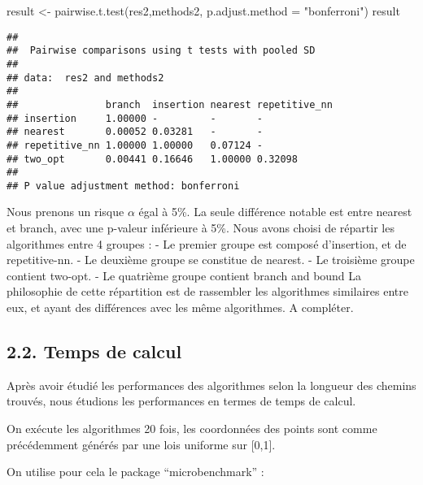 \documentclass[
]{article}
\newenvironment{Shaded}{\begin{snugshade}}{\end{snugshade}}
\newcommand{\AttributeTok}[1]{\textcolor[rgb]{0.77,0.63,0.00}{#1}}
\newcommand{\FunctionTok}[1]{\textcolor[rgb]{0.00,0.00,0.00}{#1}}
\newcommand{\NormalTok}[1]{#1}
\newcommand{\OtherTok}[1]{\textcolor[rgb]{0.56,0.35,0.01}{#1}}
\newcommand{\StringTok}[1]{\textcolor[rgb]{0.31,0.60,0.02}{#1}}
\begin{document}
\begin{Shaded}
\begin{Highlighting}[]
\NormalTok{result }\OtherTok{\textless{}{-}} \FunctionTok{pairwise.t.test}\NormalTok{(res2,methods2, }\AttributeTok{p.adjust.method =} \StringTok{"bonferroni"}\NormalTok{)}
\NormalTok{result}
\end{Highlighting}
\end{Shaded}

\begin{verbatim}
## 
##  Pairwise comparisons using t tests with pooled SD 
## 
## data:  res2 and methods2 
## 
##               branch  insertion nearest repetitive_nn
## insertion     1.00000 -         -       -            
## nearest       0.00052 0.03281   -       -            
## repetitive_nn 1.00000 1.00000   0.07124 -            
## two_opt       0.00441 0.16646   1.00000 0.32098      
## 
## P value adjustment method: bonferroni
\end{verbatim}

Nous prenons un risque \(\alpha\) égal à 5\%. La seule différence
notable est entre nearest et branch, avec une p-valeur inférieure à 5\%.
Nous avons choisi de répartir les algorithmes entre 4 groupes : - Le
premier groupe est composé d'insertion, et de repetitive-nn. - Le
deuxième groupe se constitue de nearest. - Le troisième groupe contient
two-opt. - Le quatrième groupe contient branch and bound La philosophie
de cette répartition est de rassembler les algorithmes similaires entre
eux, et ayant des différences avec les même algorithmes. A compléter.

\hypertarget{temps-de-calcul}{%
\subsection{2.2. Temps de calcul}\label{temps-de-calcul}}

Après avoir étudié les performances des algorithmes selon la longueur
des chemins trouvés, nous étudions les performances en termes de temps
de calcul.

On exécute les algorithmes 20 fois, les coordonnées des points sont
comme précédemment générés par une lois uniforme sur {[}0,1{]}.

On utilise pour cela le package ``microbenchmark'' :
\end{document}
